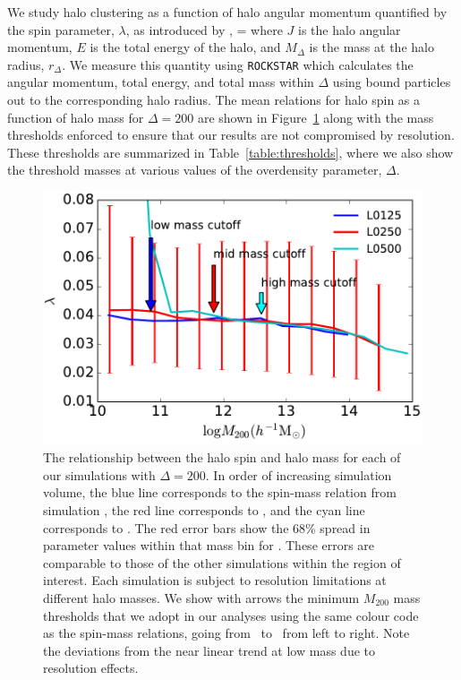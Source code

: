 \documentclass[usenatbib,fleqn]{mnras}
\begin{document}
We study halo clustering as a function of halo angular momentum quantified 
by the spin parameter, $\lambda$, as introduced by \citep{peebles69},
\beq
\lambda = 
\eeq
where $J$ is the halo angular momentum, $E$ is the total energy of the 
halo, and $M_{\Delta}$ is the mass at the halo radius, $r_{\Delta}$. We measure this quantity using {\tt ROCKSTAR} which calculates the angular momentum, total energy, and total mass within $\Delta$ using bound particles out to the corresponding halo radius.
The mean relations for halo spin as a function of halo mass for $\Delta=200$ are shown in Figure~\ref{fig:spinrelation} along with the mass thresholds enforced to ensure that our results are not compromised by resolution. These thresholds are summarized in Table~\ref{table:thresholds}, where we also show the threshold masses at various values of the overdensity parameter, $\Delta$.

\begin{figure}
\centering
\includegraphics[width=\columnwidth]{masscut_spin_d200.pdf}
\caption{
The relationship between the halo spin and halo mass for each of our simulations with $\Delta =200$. 
In order of increasing simulation volume, the blue line corresponds to the spin-mass relation from simulation 
\simA, the red line corresponds to \simB, and the cyan line corresponds to \simC. The red error bars show the 68\% spread in
parameter values within that mass bin for \simB. These errors are comparable to those of the other simulations
within the region of interest.
Each simulation is subject to resolution limitations at different halo masses. We show with arrows 
the minimum $M_{200}$ mass thresholds that we adopt in our analyses using the same colour code as 
the spin-mass relations, going from \simA \ to \simC \ from left to right. Note the deviations from the near linear trend at low mass due to resolution effects. }
\label{fig:spinrelation}
\end{figure}
\end{document}
